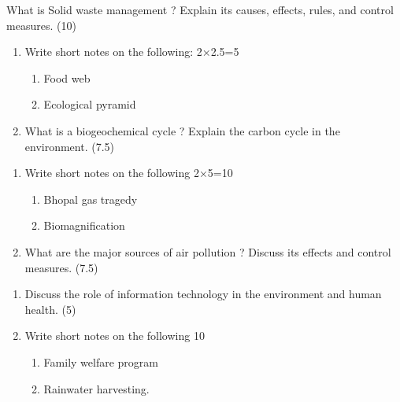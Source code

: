 \documentclass[12pt,a4paper]{article}
\begin{document}
\begin{questions}
    \vspace{\baselineskip}
    
    \item What is Solid waste management ? Explain its causes, effects, rules, and control measures. \hfill (10)

    \vspace{\baselineskip}
    
    \item \begin{enumerate}[label=(\alph*), leftmargin=2em]
        \item Write short notes on the following: \hfill 2×2.5=5
    \begin{enumerate}[label=(\roman*), leftmargin=2em]
    \item Food web
    \item Ecological pyramid
    \end{enumerate}
        \item What is a biogeochemical cycle ? Explain the carbon cycle in the environment. \hfill (7.5)
    \end{enumerate}

    \vspace{\baselineskip}
    
    \item \begin{enumerate}[label=(\alph*), leftmargin=2em]
        \item Write short notes on the following  \hfill 2×5=10
    \begin{enumerate}[label=(\roman*), leftmargin=2em]
    \item Bhopal gas tragedy 
    \item Biomagnification
    \end{enumerate}
        \item What are the major sources of air pollution ? Discuss its effects and control measures. \hfill (7.5)
    \end{enumerate}

    \vspace{\baselineskip}
    
    \item \begin{enumerate}[label=(\alph*), leftmargin=2em]
        \item Discuss the role of information technology in the environment and human health. \hfill (5)
        \item Write short notes on the following  \hfill 10
    \begin{enumerate}[label=(\roman*), leftmargin=2em]
    \item Family welfare program  
    \item  Rainwater harvesting. 
    \end{enumerate}
    \end{enumerate}

\end{questions}
\end{document}
